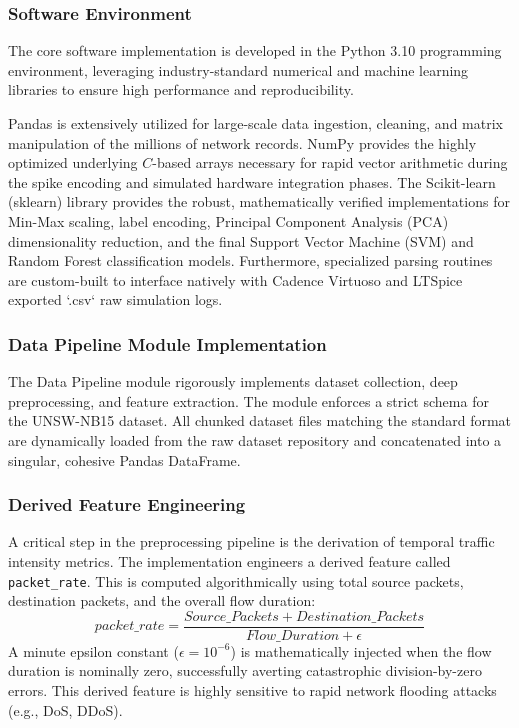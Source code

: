 \documentclass{ieeeaccess}
\begin{document}
\subsubsection{Software Environment}

The core software implementation is developed in the Python 3.10 programming environment, leveraging industry-standard numerical and machine learning libraries to ensure high performance and reproducibility. 

Pandas is extensively utilized for large-scale data ingestion, cleaning, and matrix manipulation of the millions of network records. NumPy provides the highly optimized underlying $C$-based arrays necessary for rapid vector arithmetic during the spike encoding and simulated hardware integration phases. The Scikit-learn (sklearn) library provides the robust, mathematically verified implementations for Min-Max scaling, label encoding, Principal Component Analysis (PCA) dimensionality reduction, and the final Support Vector Machine (SVM) and Random Forest classification models. Furthermore, specialized parsing routines are custom-built to interface natively with Cadence Virtuoso and LTSpice exported `.csv` raw simulation logs.

\subsubsection{Data Pipeline Module Implementation}

The Data Pipeline module rigorously implements dataset collection, deep preprocessing, and feature extraction. The module enforces a strict schema for the UNSW-NB15 dataset. All chunked dataset files matching the standard format are dynamically loaded from the raw dataset repository and concatenated into a singular, cohesive Pandas DataFrame.

\subsubsection{Derived Feature Engineering}
A critical step in the preprocessing pipeline is the derivation of temporal traffic intensity metrics. The implementation engineers a derived feature called \texttt{packet\_rate}. This is computed algorithmically using total source packets, destination packets, and the overall flow duration:
\begin{equation}
packet\_rate = \frac{Source\_Packets + Destination\_Packets}{Flow\_Duration + \epsilon}
\end{equation}
A minute epsilon constant ($\epsilon = 10^{-6}$) is mathematically injected when the flow duration is nominally zero, successfully averting catastrophic division-by-zero errors. This derived feature is highly sensitive to rapid network flooding attacks (e.g., DoS, DDoS).
\end{document}
